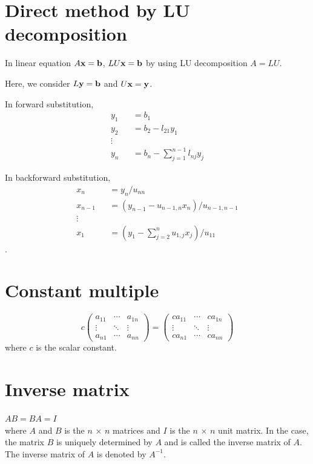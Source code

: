 \documentclass[dvipdfmx]{article}
\begin{document}
\section*{Direct method by LU decomposition}
In linear equation $A{\bf{x}} = {\bf{b}}$, 
$LU{\bf{x}} = {\bf{b}}$
by using LU decomposition $A = LU$.

Here, we consider $L{\bf{y}} = {\bf{b}}$ and $U{\bf{x}} = {\bf{y}}$.

In forward substitution,
\begin{eqnarray}
y_1 &&= b_1 \nonumber \\
y_2 &&= b_2 - l_{21}y_1 \nonumber \\
{\vdots} \nonumber \\
y_n &&= b_n - {\sum_{j=1}^{n-1}} l_{nj}y_j \nonumber 
\end{eqnarray}

In backforward substitution,
\begin{eqnarray}
x_n &&= y_n / u_{nn} \nonumber \\ 
x_{n-1} &&= (y_{n-1} - u_{n-1, n}x_n) / u_{n-1, n-1} \nonumber \\ 
{\vdots} \nonumber \\
x_1 &&= (y_1 - {\sum_{j=2}^{n}} u_{1, j}x_j) / u_{11} \nonumber 
\end{eqnarray} .


\section*{Constant multiple}
 \[
   c
   \left(
   \begin{array}{ccc}
   a_{11} & \cdots & a_{1n} \\
   \vdots & \ddots  & \vdots \\
   a_{n1} & \cdots & a_{nn}
   \end{array}
   \right)
   =
   \left(
   \begin{array}{ccc}
   ca_{11} & \cdots & ca_{1n} \\
   \vdots & \ddots  & \vdots \\
   ca_{n1} & \cdots & ca_{nn}
   \end{array}
   \right)
   \]
where $c$ is the scalar constant.


\section*{Inverse matrix}
$AB = BA = I$ \\
where $A$ and $B$ is the $n$ × $n$ matrices and $I$ is the $n$ × $n$ unit matrix.
In the case, the matrix $B$ is uniquely determined by $A$ and is called the inverse matrix of $A$.
The inverse matrix of $A$ is denoted by $A^{-1}$.
\end{document}
